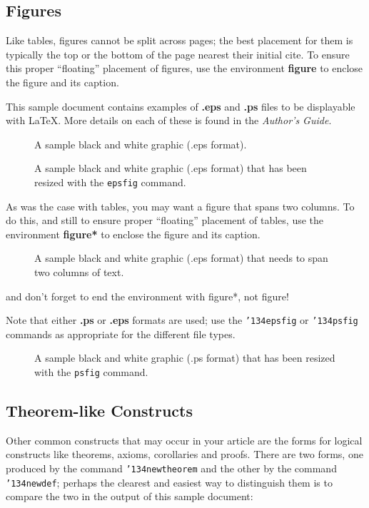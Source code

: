 \documentclass{acm_proc_article-sp-sigmod09}
\begin{document}
\subsection{Figures}
Like tables, figures cannot be split across pages; the
best placement for them
is typically the top or the bottom of the page nearest
their initial cite.  To ensure this proper ``floating'' placement
of figures, use the environment
\textbf{figure} to enclose the figure and its caption.

This sample document contains examples of \textbf{.eps}
and \textbf{.ps} files to be displayable with \LaTeX.  More
details on each of these is found in the \textit{Author's Guide}.

\begin{figure}
\centering
{}
\caption{A sample black and white graphic (.eps format).}
\end{figure}

\begin{figure}
\centering
{}
\caption{A sample black and white graphic (.eps format)
that has been resized with the \texttt{epsfig} command.}
\end{figure}


As was the case with tables, you may want a figure
that spans two columns.  To do this, and still to
ensure proper ``floating'' placement of tables, use the environment
\textbf{figure*} to enclose the figure and its caption.
\begin{figure}
\centering
{}
\caption{A sample black and white graphic (.eps format)
that needs to span two columns of text.}
\end{figure}
and don't forget to end the environment with
{figure*}, not {figure}!

Note that either {\textbf{.ps}} or {\textbf{.eps}} formats are
used; use
the \texttt{{\char'134}epsfig} or \texttt{{\char'134}psfig}
commands as appropriate for the different file types.

\begin{figure}
\centering
{}
\caption{A sample black and white graphic (.ps format) that has
been resized with the \texttt{psfig} command.}
\end{figure}

\subsection{Theorem-like Constructs}
Other common constructs that may occur in your article are
the forms for logical constructs like theorems, axioms,
corollaries and proofs.  There are
two forms, one produced by the
command \texttt{{\char'134}newtheorem} and the
other by the command \texttt{{\char'134}newdef}; perhaps
the clearest and easiest way to distinguish them is
to compare the two in the output of this sample document:
\end{document}
